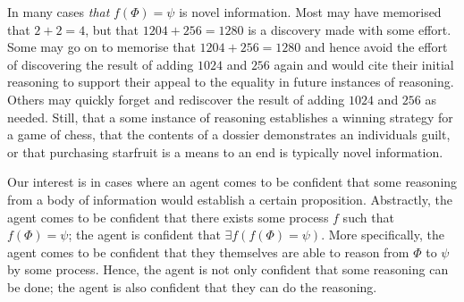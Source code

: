 \documentclass[10pt]{article}
\begin{document}
In many cases \emph{that} \(f(\Phi) = \psi\) is novel information.
Most may have memorised that \(2 + 2 = 4\), but that \(1204 + 256 = 1280\) is a discovery made with some effort.
Some may go on to memorise that \(1204 + 256 = 1280\) and hence avoid the effort of discovering the result of adding \(1024\) and \(256\) again and would cite their initial reasoning to support their appeal to the equality in future instances of reasoning.
Others may quickly forget and rediscover the result of adding \(1024\) and \(256\) as needed.
Still, that a some instance of reasoning establishes a winning strategy for a game of chess, that the contents of a dossier demonstrates an individuals guilt, or that purchasing starfruit is a means to an end is typically novel information.

Our interest is in cases where an agent comes to be confident that some reasoning from a body of information would establish a certain proposition.
Abstractly, the agent comes to be confident that there exists some process \(f\) such that \(f(\Phi) = \psi\); the agent is confident that \(\exists f(f(\Phi) = \psi)\).
More specifically, the agent comes to be confident that they themselves are able to reason from \(\Phi\) to \(\psi\) by some process.
Hence, the agent is not only confident that some reasoning can be done; the agent is also confident that they can do the reasoning.
\end{document}
